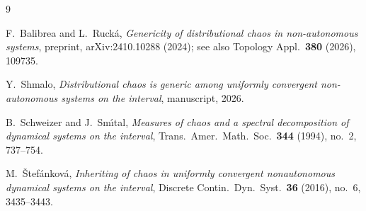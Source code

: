 ﻿\documentclass[11pt]{article}
\begin{document}
\begin{thebibliography}{9}

F.~Balibrea and L.~Ruck\'a,
\emph{Genericity of distributional chaos in non-autonomous systems},
preprint, arXiv:2410.10288 (2024); see also
Topology Appl.\ \textbf{380} (2026), 109735.

Y.~Shmalo,
\emph{Distributional chaos is generic among uniformly convergent non-autonomous
systems on the interval},
manuscript, 2026.

B.~Schweizer and J.~Sm\'\i tal,
\emph{Measures of chaos and a spectral decomposition of dynamical systems on the
interval},
Trans.\ Amer.\ Math.\ Soc.\ \textbf{344} (1994), no.~2, 737--754.

M.~\v Stef\'ankov\'a,
\emph{Inheriting of chaos in uniformly convergent nonautonomous dynamical systems
on the interval},
Discrete Contin.\ Dyn.\ Syst.\ \textbf{36} (2016), no.~6, 3435--3443.

\end{thebibliography}
\end{document}
